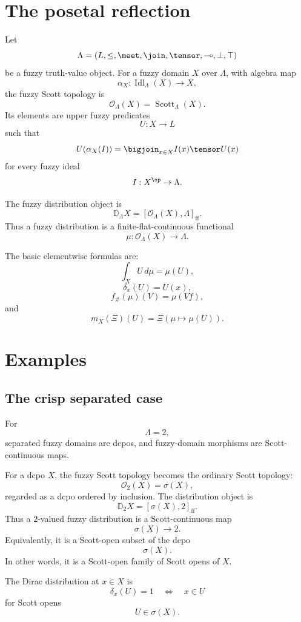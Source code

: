 \section{The posetal reflection}
\label{sec:posetal-reflection-fuzzy-distributions}

Let
\[
    \Lambda=(L,\leq,\meet,\join,\tensor,\multimap,\bot,\top)
\]
be a fuzzy truth-value object.  For a fuzzy domain \(X\) over \(\Lambda\), with
algebra map
\[
    \alpha_X:\operatorname{Idl}_{\Lambda}(X)\to X,
\]
the fuzzy Scott topology is
\[
    \mathcal O_{\Lambda}(X)
    =
    \operatorname{Scott}_{\Lambda}(X).
\]
Its elements are upper fuzzy predicates
\[
    U:X\to L
\]
such that
\[
    U(\alpha_X(I))
    =
    \bigjoin_{x\in X} I(x)\tensor U(x)
\]
for every fuzzy ideal
\[
    I:X^{\op}\to\Lambda.
\]

The fuzzy distribution object is
\[
    \mathbb D_{\Lambda}X
    =
    [\mathcal O_{\Lambda}(X),\Lambda]_{\mathrm{ff}}.
\]
Thus a fuzzy distribution is a finite-flat-continuous functional
\[
    \mu:\mathcal O_{\Lambda}(X)\to\Lambda.
\]

The basic elementwise formulas are:
\[
    \int_X U\,d\mu
    =
    \mu(U),
\]
\[
    \delta_x(U)=U(x),
\]
\[
    f_{\#}(\mu)(V)=\mu(Vf),
\]
and
\[
    m_X(\Xi)(U)
    =
    \Xi(\mu\mapsto\mu(U)).
\]

\section{Examples}
\label{sec:fuzzy-distribution-examples}

\subsection{The crisp separated case}
\label{subsec:crisp-separated-distribution-recovery}

For
\[
    \Lambda=2,
\]
separated fuzzy domains are dcpos, and fuzzy-domain morphisms are
Scott-continuous maps.

For a dcpo \(X\), the fuzzy Scott topology becomes the ordinary Scott topology:
\[
    \mathcal O_2(X)=\sigma(X),
\]
regarded as a dcpo ordered by inclusion.  The distribution object is
\[
    \mathbb D_2X
    =
    [\sigma(X),2]_{\mathrm{ff}}.
\]
Thus a \(2\)-valued fuzzy distribution is a Scott-continuous map
\[
    \sigma(X)\to 2.
\]
Equivalently, it is a Scott-open subset of the dcpo
\[
    \sigma(X).
\]
In other words, it is a Scott-open family of Scott opens of \(X\).

The Dirac distribution at \(x\in X\) is
\[
    \delta_x(U)=1
    \quad\Longleftrightarrow\quad
    x\in U
\]
for Scott opens
\[
    U\in\sigma(X).
\]

